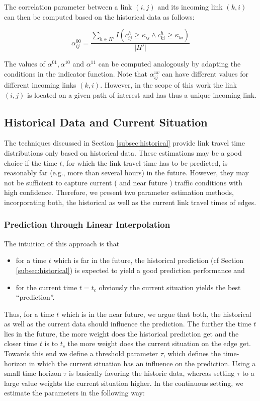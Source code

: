 The correlation parameter between a link $(i,j)$ and its incoming link $(k,i)$
can then be computed based on the historical data as follows:

\begin{equation}
	\alpha^{00}_{ij} = \frac{\sum_{h\in H'} I(c_{ij}^h \geq
	\kappa_{ij} \wedge c_{ki}^h \geq
	\kappa_{ki})}{|H'|}
\end{equation}

The values of $\alpha^{01}, \alpha^{10}$ and $\alpha^{11}$ can be computed
analogously by adapting the conditions in the indicator function. Note that
$\alpha^{uv}_{ij}$ can have different values for different incoming links
$(k,i)$. However, in the scope of this work the link $(i,j)$ is located on a
given path of interest and has thus a unique incoming link.

\subsection{Historical Data and Current Situation}
The techniques discussed in Section \ref{subsec:historical} provide link travel
time distributions only based on historical data. These estimations may be a
good choice if the time $t$, for which the link travel time has to be predicted,
is reasonably far (e.g., more than several hours) in the future.  However, they
may not be sufficient to capture current ( and near future )  traffic
conditions with high confidence. Therefore, we present two parameter estimation
methods, incorporating both, the historical as well as the current link travel
times of edges.

\subsubsection{Prediction through Linear Interpolation}
\label{subsec:LI}
The intuition of this approach is that 
\begin{itemize}
  \item for a time $t$ which is far in the future, the historical prediction (cf Section
\ref{subsec:historical}) is expected to yield a good prediction performance and
\item for the current time $t = t_c$ obviously the current situation yields the
best ``prediction''.
\end{itemize}

Thus, for a time $t$ which is in the near future, we argue that both, the
historical as well as the current data should influence the prediction. The
further the time $t$ lies in the future, the more weight does the historical
prediction get and the closer time $t$ is to $t_c$ the more weight does the
current situation on the edge get. Towards this end we define a threshold
parameter $\tau$, which defines the time-horizon in which the current situation
has an influence on the prediction. Using a small time horizon $\tau$ is
basically favoring the historic data, whereas setting $\tau$ to a large value
weights the current situation higher. In the continuous setting, we estimate the
parameters in the following way:

